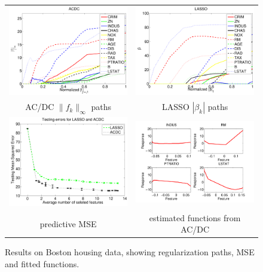 \begin{figure}[!t]
\begin{center}
\begin{tabular}{cc}
  \includegraphics[width=.37\textwidth]{figs/acdc_path} &
  \includegraphics[width=.37\textwidth]{figs/lasso_path} 
\\
AC/DC $\|f_k\|_\infty$ paths & 
LASSO $|\beta_k|$ paths \\
  \includegraphics[width=.37\textwidth]{figs/MSEacdc} &
  \includegraphics[width=.43\textwidth]{figs/acdc_functs}
\\
predictive MSE & estimated functions from AC/DC
\end{tabular}
\end{center}
\caption{Results on Boston housing data, showing regularization paths,
 MSE and fitted functions.}\label{Boston}
\end{figure}


 

